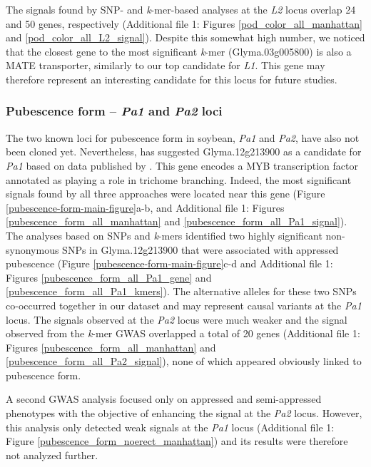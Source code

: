 The signals found by SNP- and \emph{k}-mer-based analyses at the \textit{L2}
locus overlap 24 and 50 genes, respectively (Additional file 1: Figures
\ref{pod_color_all_manhattan} and \ref{pod_color_all_L2_signal}). Despite this
somewhat high number, we noticed that the closest gene to the most significant
\emph{k}-mer (Glyma.03g005800) is also a MATE transporter, similarly to our top
candidate for \emph{L1}. This gene may therefore represent an interesting
candidate for this locus for future studies.

\subsubsection*{Pubescence form -- \textit{Pa1} and \textit{Pa2} loci}
\label{sv-gwas-main-results-pubescence-form-pa1-pa2}

The two known loci for pubescence form in soybean, \textit{Pa1} and
\textit{Pa2}, have also not been cloned yet. Nevertheless, \cite{gilbert2017}
has suggested Glyma.12g213900 as a candidate for \textit{Pa1} based on data
published by \cite{bandillo2017}. This gene encodes a MYB transcription factor
annotated as playing a role in trichome branching. Indeed, the most significant
signals found by all three approaches were located near this gene (Figure
\ref{pubescence-form-main-figure}a-b, and Additional file 1: Figures \ref{pubescence_form_all_manhattan} and
\ref{pubescence_form_all_Pa1_signal}).  The analyses based on SNPs and
\emph{k}-mers identified two highly significant non-synonymous SNPs in
Glyma.12g213900 that were associated with appressed pubescence (Figure
\ref{pubescence-form-main-figure}c-d and Additional file 1: Figures \ref{pubescence_form_all_Pa1_gene} and
\ref{pubescence_form_all_Pa1_kmers}). The alternative alleles for these two
SNPs co-occurred together in our dataset and may represent causal variants at
the \emph{Pa1} locus. The signals observed at the \emph{Pa2} locus were much
weaker and the signal observed from the \emph{k}-mer GWAS overlapped a total of
20 genes (Additional file 1: Figures \ref{pubescence_form_all_manhattan} and
\ref{pubescence_form_all_Pa2_signal}), none of which appeared obviously linked
to pubescence form.

A second GWAS analysis focused only on appressed and semi-appressed phenotypes
with the objective of enhancing the signal at the \emph{Pa2} locus. However,
this analysis only detected weak signals at the \emph{Pa1} locus (Additional file 1: Figure
\ref{pubescence_form_noerect_manhattan}) and its results were therefore not
analyzed further.

